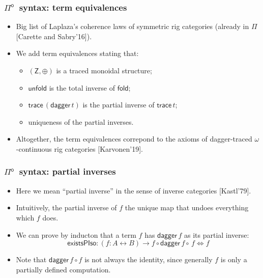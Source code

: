 \documentclass[12pt,t]{beamer}
\newcommand{\Pio}{\ensuremath{\mathsf{\Pi}^{\mathsf{o}}}}
\newcommand{\lr}{\longleftrightarrow}
\newcommand{\fold}{\mathsf{fold}}
\newcommand{\unfold}{\mathsf{unfold}}
\newcommand{\trace}{\ensuremath{\mathsf{trace}}}
\newcommand{\Z}{\mathsf{Z}}
\newcommand{\LR}{\iff}
\renewcommand{\dagger}{\mathsf{dagger}}
\begin{document}
\begin{frame}
  \frametitle{\Pio\ syntax: term equivalences}
  \begin{itemize}    
  \item Big list of Laplaza's coherence laws of symmetric rig
    categories (already in $\Pi$ [Carette and Sabry'16]).
  \item We add term equivalences stating that:
    \begin{itemize}
    \item $(\Z,\oplus)$ is a traced monoidal structure;
    \item $\unfold$ is the total inverse of $\fold$;
    \item $\trace\,(\dagger \,t)$ is the partial inverse of $\trace\,t$;
    \item uniqueness of the partial inverses.
    \end{itemize}

    \vspace{\fill}
  \item Altogether, the term equivalences correpond to the axioms of
    dagger-traced $\omega$-continuous rig categories [Karvonen'19].
    \end{itemize}
\end{frame}

\begin{frame}
  \frametitle{\Pio\ syntax: partial inverses}
  \begin{itemize}
  \item Here we mean ``partial inverse'' in the sense of inverse
    categories [Kastl'79].
  \item Intuitively, the partial inverse of $f$ the unique map that
    undoes everything which $f$ does.
  \item We can prove by inducton that a term $f$ has $\dagger\,f$ as
    its partial inverse:
    \[
    \mathsf{existsPIso} : (f : A \lr B) \to f \circ \dagger\,f
    \circ\,f \LR f
    \]
    \vspace{\fill}
  \item Note that $\dagger \,f \circ f$ is not always the identity,
    since generally $f$ is only a partially defined computation.
  \end{itemize}
\end{frame}
\end{document}
